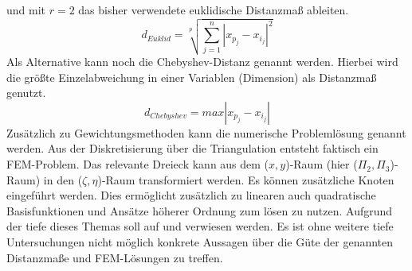 und mit $r = 2$ das bisher verwendete euklidische Distanzmaß ableiten.
\begin{equation}\label{f76}
d_{Euklid} = \sqrt[p]{\sum_{j=1}^n|x_{p_j}-x_{i_j}|^2}
\end{equation}
Als Alternative kann noch die Chebyshev-Distanz genannt werden. Hierbei wird die größte Einzelabweichung in einer Variablen (Dimension) als Distanzmaß genutzt.
\begin{equation}\label{f77}
d_{Chebyshev} = max|x_{p_j}-x_{i_j}|
\end{equation}
Zusätzlich zu Gewichtungsmethoden kann die numerische Problemlösung genannt werden. Aus der Diskretisierung über die Triangulation entsteht faktisch ein FEM-Problem. Das relevante Dreieck kann aus dem ($x,y$)-Raum (hier ($\Pi_2 , \Pi_3$)-Raum) in den ($\zeta, \eta$)-Raum transformiert werden. Es können zusätzliche Knoten eingeführt werden. Dies ermöglicht zusätzlich zu linearen auch quadratische Basisfunktionen und Ansätze höherer Ordnung zum lösen zu nutzen. Aufgrund der tiefe dieses Themas soll auf  \cite{Hah14} und \cite{MW09} verwiesen werden. Es ist ohne weitere tiefe Untersuchungen nicht möglich konkrete Aussagen über die Güte der genannten Distanzmaße und FEM-Lösungen zu treffen.

